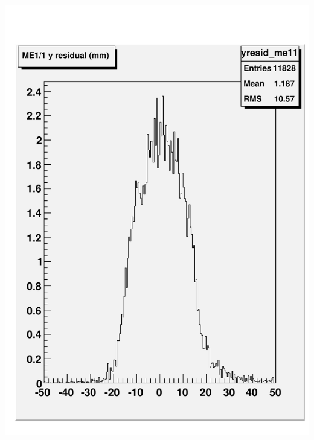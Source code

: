 \documentclass[compress]{beamer}
\begin{document}
\begin{frame}
\begin{columns}
\includegraphics[width=0.7\linewidth]{talk_me11_yresid_207.pdf}
\end{columns}
\end{frame}
\end{document}
